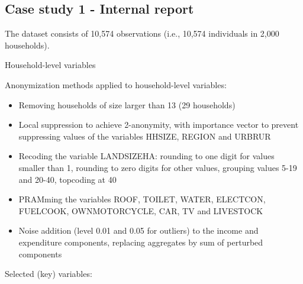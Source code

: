 \documentclass[letterpaper,10pt,english]{sphinxmanual}
\begin{document}
\subsection{Case study 1 - Internal report}
\label{\detokenize{appendices:case-study-1-internal-report}}

The dataset consists of 10,574 observations (i.e., 10,574 individuals in 2,000 households).

Household-level variables

Anonymization methods applied to household-level variables:
\begin{itemize}
\item {} 
Removing households of size larger than 13 (29 households)

\item {} 
Local suppression to achieve 2-anonymity, with importance vector to prevent suppressing values of the variables HHSIZE, REGION and URBRUR

\item {} 
Recoding the variable LANDSIZEHA: rounding to one digit for values smaller than 1, rounding to zero digits for other values, grouping values 5-19 and 20-40, topcoding at 40

\item {} 
PRAMming the variables ROOF, TOILET, WATER, ELECTCON, FUELCOOK, OWNMOTORCYCLE, CAR, TV and LIVESTOCK

\item {} 
Noise addition (level 0.01 and 0.05 for outliers) to the income and expenditure components, replacing aggregates by sum of perturbed components

\end{itemize}

Selected (key) variables:
\end{document}
